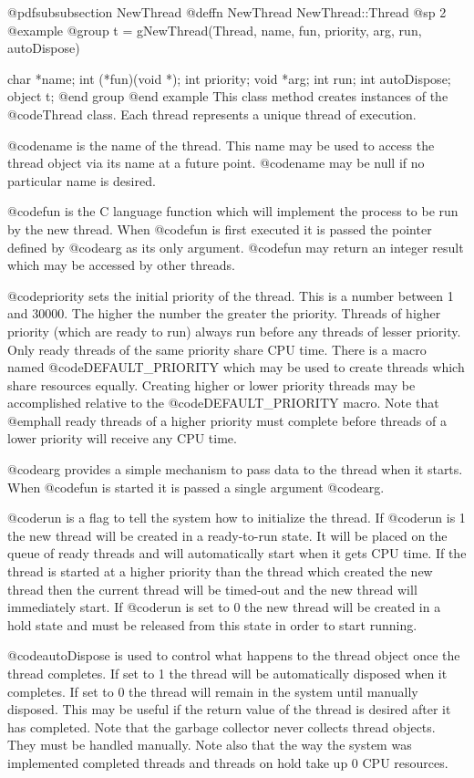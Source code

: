 @pdfsubsubsection {NewThread}
@deffn {NewThread} NewThread::Thread
@sp 2
@example
@group
t = gNewThread(Thread, name, fun, priority, arg, run,
               autoDispose)

char    *name;
int     (*fun)(void *);
int     priority;
void    *arg;
int     run;
int     autoDispose;
object  t;
@end group
@end example
This class method creates instances of the @code{Thread} class.  Each
thread represents a unique thread of execution.

@code{name} is the name of the thread.  This name may be used to access
the thread object via its name at a future point.  @code{name} may
be null if no particular name is desired.

@code{fun} is the C language function which will implement the process
to be run by the new thread.  When @code{fun} is first executed it is
passed the pointer defined by @code{arg} as its only argument.  @code{fun}
may return an integer result which may be accessed by other threads.

@code{priority} sets the initial priority of the thread.  This is a number
between 1 and 30000.  The higher the number the greater the priority.
Threads of higher priority (which are ready to run) always run before
any threads of lesser priority.  Only ready threads of the same priority
share CPU time.  There is a macro named @code{DEFAULT_PRIORITY} which
may be used to create threads which share resources equally.  Creating
higher or lower priority threads may be accomplished relative to the
@code{DEFAULT_PRIORITY} macro.  Note that @emph{all} ready threads of
a higher priority must complete before threads of a lower priority will
receive any CPU time.

@code{arg} provides a simple mechanism to pass data to the thread when
it starts.  When @code{fun} is started it is passed a single argument
@code{arg}.

@code{run} is a flag to tell the system how to initialize the thread.
If @code{run} is 1 the new thread will be created in a ready-to-run
state.  It will be placed on the queue of ready threads and will
automatically start when it gets CPU time.  If the thread is started
at a higher priority than the thread which created the new thread
then the current thread will be timed-out and the new thread will
immediately start.  If @code{run} is set to 0 the new thread will
be created in a hold state and must be released from this state
in order to start running.

@code{autoDispose} is used to control what happens to the thread
object once the thread completes.  If set to 1 the thread will be
automatically disposed when it completes.  If set to 0 the thread
will remain in the system until manually disposed.  This may
be useful if the return value of the thread is desired after it
has completed.  Note that the garbage collector never collects
thread objects.  They must be handled manually.  Note also that
the way the system was implemented completed threads and threads
on hold take up 0 CPU resources.


